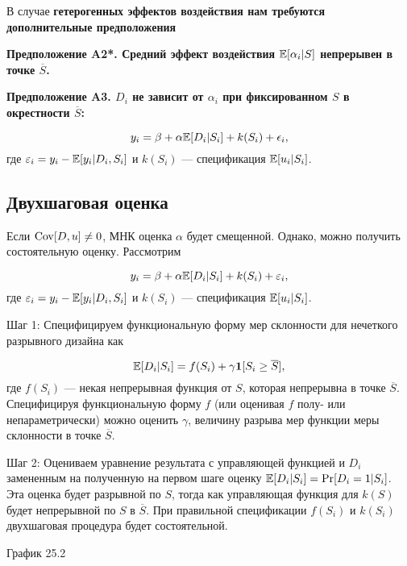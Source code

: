 В случае \bfseries гетерогенных эффектов воздействия \mdseries нам требуются дополнительные предположения

\bfseries Предположение A2*. \mdseries Средний эффект воздействия $\mathbb{E} [\alpha_i | S]$ непрерывен в точке $\overline{S}$.

\bfseries Предположение A3. \mdseries $D_i$ не зависит от $\alpha_i$ при фиксированном $S$ в окрестности $\overline{S}$:

\begin{equation}
\label{eq25.61}
y_i = \beta + \alpha \mathbb{E}[D_i|S_i] + k (S_i) + \epsilon_i,
\end{equation}
где $\varepsilon_i = y_i - \mathbb{E} [y_i | D_i , S_i ] $ и $k(S_i)$ --- спецификация $\mathbb{E} [u_i | S_i ]$. 

\subsection{Двухшаговая оценка}

Если $\mathrm{Cov} [D,u] \ne 0$, МНК оценка $\alpha$ будет смещенной. Однако, можно получить состоятельную оценку. Рассмотрим

\begin{equation}
\label{eq25.62}
y_i = \beta + \alpha \mathbb{E}[D_i|S_i] + k (S_i) + \varepsilon_i,
\end{equation}
где $\varepsilon_i = y_i - \mathbb{E} [y_i | D_i , S_i ] $ и $k(S_i)$ --- спецификация $\mathbb{E} [u_i | S_i ]$. 

Шаг 1: Специфицируем функциональную форму мер склонности для нечеткого разрывного дизайна как

\begin{equation}
\label{eq25.63}
\mathbb{E} [D_i | S_i] = f (S_i) + \gamma \boldsymbol{1} [S_i \ge \overline{S}],
\end{equation}
где $f (S_i)$ --- некая непрерывная функция от $S$, которая непрерывна в точке $\overline{S}$. Специфицируя функциональную форму $f$ (или оценивая $f$ полу- или непараметрически) можно оценить $\gamma$, величину разрыва мер функции меры склонности в точке $\overline{S}$. 

Шаг 2: Оцениваем уравнение результата с управляющей функцией и $D_i$ замененным на полученную на первом шаге оценку $\mathbb{E} [D_i | S_i ] = \mathrm{Pr} [D_i = 1 | S_i]$. Эта оценка будет разрывной по $S$, тогда как управляющая функция для $k(S)$ будет непрерывной по $S$ в $\overline{S}$. При правильной спецификации $f(S_i)$ и $k(S_i)$ двухшаговая процедура будет состоятельной. 

\vspace{3cm}
График 25.2

